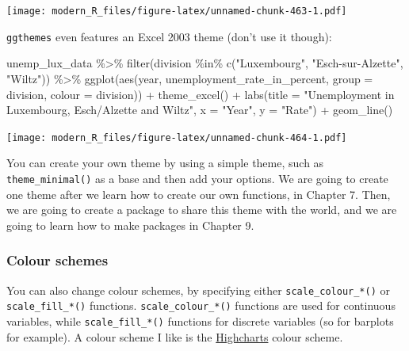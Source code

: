 \documentclass[
]{article}
\newenvironment{Shaded}{\begin{snugshade}}{\end{snugshade}}
\newcommand{\AttributeTok}[1]{\textcolor[rgb]{0.77,0.63,0.00}{#1}}
\newcommand{\FunctionTok}[1]{\textcolor[rgb]{0.00,0.00,0.00}{#1}}
\newcommand{\NormalTok}[1]{#1}
\newcommand{\SpecialCharTok}[1]{\textcolor[rgb]{0.00,0.00,0.00}{#1}}
\newcommand{\StringTok}[1]{\textcolor[rgb]{0.31,0.60,0.02}{#1}}
\begin{document}
\texttt{[image: modern\_R\_files/figure-latex/unnamed-chunk-463-1.pdf]}

\texttt{ggthemes} even features an Excel 2003 theme (don't use it though):

\begin{Shaded}
\begin{Highlighting}[]
\NormalTok{unemp\_lux\_data }\SpecialCharTok{\%\textgreater{}\%}
  \FunctionTok{filter}\NormalTok{(division }\SpecialCharTok{\%in\%} \FunctionTok{c}\NormalTok{(}\StringTok{"Luxembourg"}\NormalTok{, }\StringTok{"Esch{-}sur{-}Alzette"}\NormalTok{, }\StringTok{"Wiltz"}\NormalTok{)) }\SpecialCharTok{\%\textgreater{}\%}
  \FunctionTok{ggplot}\NormalTok{(}\FunctionTok{aes}\NormalTok{(year, unemployment\_rate\_in\_percent, }\AttributeTok{group =}\NormalTok{ division, }\AttributeTok{colour =}\NormalTok{ division)) }\SpecialCharTok{+}
  \FunctionTok{theme\_excel}\NormalTok{() }\SpecialCharTok{+}
  \FunctionTok{labs}\NormalTok{(}\AttributeTok{title =} \StringTok{"Unemployment in Luxembourg, Esch/Alzette and Wiltz"}\NormalTok{, }\AttributeTok{x =} \StringTok{"Year"}\NormalTok{, }\AttributeTok{y =} \StringTok{"Rate"}\NormalTok{) }\SpecialCharTok{+}
  \FunctionTok{geom\_line}\NormalTok{()}
\end{Highlighting}
\end{Shaded}

\texttt{[image: modern\_R\_files/figure-latex/unnamed-chunk-464-1.pdf]}

You can create your own theme by using a simple theme, such as \texttt{theme\_minimal()} as a base
and then add your options. We are going to create one theme after we learn how to create our
own functions, in Chapter 7. Then, we are going to create a package to share this theme with
the world, and we are going to learn how to make packages in Chapter 9.

\hypertarget{colour-schemes}{%
\subsubsection{Colour schemes}\label{colour-schemes}}

You can also change colour schemes, by specifying either \texttt{scale\_colour\_*()} or \texttt{scale\_fill\_*()}
functions. \texttt{scale\_colour\_*()} functions are used for continuous variables, while \texttt{scale\_fill\_*()}
functions for discrete variables (so for barplots for example). A colour scheme I like is the
\href{https://www.highcharts.com/}{Highcharts} colour scheme.
\end{document}

